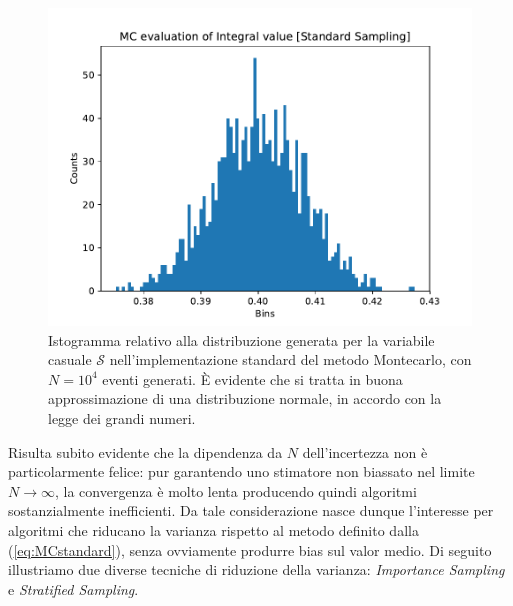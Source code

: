 \begin{figure}
	\centering
	\includegraphics[width=.7\textwidth]{Immagini/Es4Hist.pdf}
	\caption{Istogramma relativo alla distribuzione generata per la variabile casuale $\mathcal{S}$ nell'implementazione standard del metodo Montecarlo, con $N=10^4$ eventi generati. \`E evidente che si tratta in buona approssimazione di una distribuzione normale, in accordo con la legge dei grandi numeri.}
	\label{fig:MCHist}
\end{figure}

\noindent Risulta subito evidente che la dipendenza da $N$ dell'incertezza non è particolarmente felice: pur garantendo uno stimatore non biassato nel limite $N\to\infty$, la convergenza è molto lenta producendo quindi algoritmi sostanzialmente inefficienti. Da tale considerazione nasce dunque l'interesse per algoritmi che riducano la varianza rispetto al metodo definito dalla (\ref{eq:MCstandard}), senza ovviamente produrre bias sul valor medio. Di seguito illustriamo due diverse tecniche di riduzione della varianza: \emph{Importance Sampling} e \emph{Stratified Sampling}.

